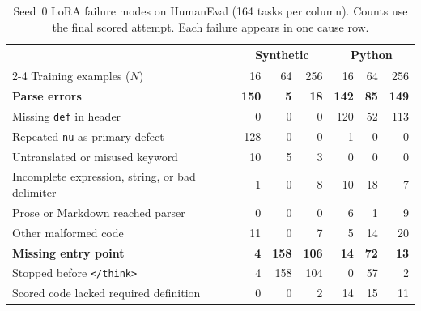 \begin{table}[htbp]
\centering
\small
\caption{Seed~0 LoRA failure modes on HumanEval (164 tasks per column).
Counts use the final scored attempt. Each failure appears in one cause row.}
\label{tab:lora-humaneval-failures}
\begin{tabular}{@{}lrrrrrr@{}}
\hline
 & \multicolumn{3}{c}{Synthetic} & \multicolumn{3}{c}{Python} \\
\cline{2-4}\cline{5-7}
Training examples ($N$) & 16 & 64 & 256 & 16 & 64 & 256 \\
\hline
\textbf{Parse errors} & \textbf{150} & \textbf{5} & \textbf{18}
                      & \textbf{142} & \textbf{85} & \textbf{149} \\
\quad Missing \texttt{def} in header & 0 & 0 & 0 & 120 & 52 & 113 \\
\quad Repeated \texttt{nu} as primary defect & 128 & 0 & 0 & 1 & 0 & 0 \\
\quad Untranslated or misused keyword & 10 & 5 & 3 & 0 & 0 & 0 \\
\quad Incomplete expression, string, or bad delimiter & 1 & 0 & 8 & 10 & 18 & 7 \\
\quad Prose or Markdown reached parser & 0 & 0 & 0 & 6 & 1 & 9 \\
\quad Other malformed code & 11 & 0 & 7 & 5 & 14 & 20 \\
\hline
\textbf{Missing entry point} & \textbf{4} & \textbf{158} & \textbf{106}
                             & \textbf{14} & \textbf{72} & \textbf{13} \\
\quad Stopped before \texttt{</think>} & 4 & 158 & 104 & 0 & 57 & 2 \\
\quad Scored code lacked required definition & 0 & 0 & 2 & 14 & 15 & 11 \\
\hline
\end{tabular}
\end{table}
